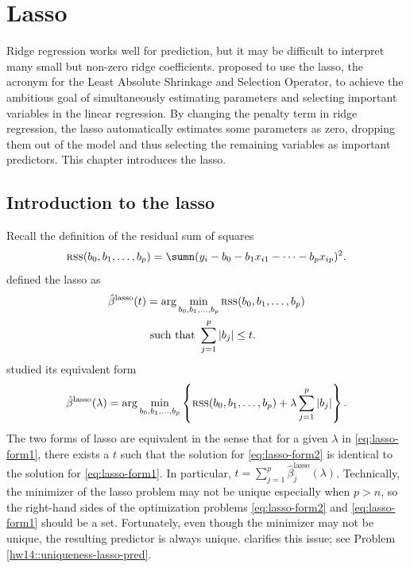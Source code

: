 
\chapter{Lasso}\label{chapter::lasso}

Ridge regression works well for prediction, but it may be difficult
to interpret many small but non-zero ridge coefficients. \citet{tibshirani1996regression} proposed to use the lasso, the acronym for the Least Absolute Shrinkage
and Selection Operator, to achieve the ambitious goal of simultaneously
estimating parameters and selecting important variables in the linear
regression. By changing the penalty term in ridge regression,
the lasso automatically estimates some parameters as zero, dropping
them out of the model and thus selecting the remaining variables as
important predictors. 
This chapter introduces the lasso. 




 
\section{Introduction to the lasso}


Recall the definition of the residual sum of squares 
$$
\textsc{rss}(b_0,b_1,\ldots,b_p) = 
\sumn(y_{i}-b_{0}-b_{1}x_{i1}-\cdots-b_{p}x_{ip})^{2}.
$$
\citet{tibshirani1996regression} defined the lasso as 
\begin{align}
\hat{\beta}^{\text{lasso}}(t) & =\arg\min_{b_{0},b_{1},\ldots,b_{p}}\textsc{rss}(b_0,b_1,\ldots,b_p)  \nonumber \\
 & \ \text{such that }\sum_{j=1}^{p}|b_{j}|\ensuremath{\leq t} .\label{eq:lasso-form2}
\end{align}
\citet{osborne2000lasso} studied its equivalent form
\begin{equation}
\hat{\beta}^{\text{lasso}}(\lambda)=\arg\min_{b_{0},b_{1},\ldots,b_{p}}\left\{\textsc{rss}(b_0,b_1,\ldots,b_p) +\lambda\sum_{j=1}^{p}|b_{j}|\right\} . \label{eq:lasso-form1}
\end{equation}
The two forms of lasso are equivalent in the sense that for a given $\lambda$ in \eqref{eq:lasso-form1}, there exists a $t$ such that the solution for \eqref{eq:lasso-form2} is identical to the solution for \eqref{eq:lasso-form1}. In particular, $t = \sum_{j=1}^p \hat{\beta}^{\text{lasso}}_j(\lambda) $. 
Technically, the minimizer of the lasso problem may not be unique especially when $p>n$, so the right-hand sides of the optimization problems \eqref{eq:lasso-form2} and \eqref{eq:lasso-form1} should be a set. Fortunately, even though the minimizer may not be unique, the resulting predictor is always unique. \citet{tibshirani2013lasso} clarifies this issue; see Problem \ref{hw14::uniqueness-lasso-pred}. 



